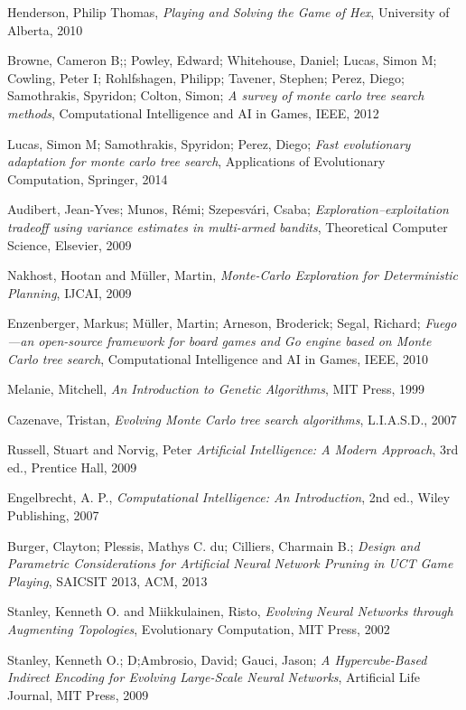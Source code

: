 \documentclass[12pt]{report}
\begin{document}
\begin{thebibliography}{99}
 Henderson, Philip Thomas, \emph{Playing and Solving the Game of Hex}, University of Alberta, 2010

 Browne, Cameron B;; Powley, Edward; Whitehouse, Daniel; Lucas, Simon M; Cowling, Peter I; Rohlfshagen, Philipp; Tavener, Stephen; Perez, Diego; Samothrakis, Spyridon; Colton, Simon; \emph{A survey of monte carlo tree search methods}, Computational Intelligence and AI in Games, IEEE, 2012

 Lucas, Simon M; Samothrakis, Spyridon; Perez, Diego; \emph{Fast evolutionary adaptation for monte carlo tree search}, Applications of Evolutionary Computation, Springer, 2014

 Audibert, Jean-Yves; Munos, R{\'e}mi; Szepesv{\'a}ri, Csaba; \emph{Exploration--exploitation tradeoff using variance estimates in multi-armed bandits}, Theoretical Computer Science, Elsevier, 2009

 Nakhost, Hootan and M{\"u}ller, Martin, \emph{Monte-Carlo Exploration for Deterministic Planning}, IJCAI, 2009

 Enzenberger, Markus; M{\"u}ller, Martin; Arneson, Broderick; Segal, Richard; \emph{Fuego—an open-source framework for board games and Go engine based on Monte Carlo tree search}, Computational Intelligence and AI in Games, IEEE, 2010

 Melanie, Mitchell, \emph{An Introduction to Genetic Algorithms},  MIT Press, 1999

 Cazenave, Tristan, \emph{Evolving Monte Carlo tree search algorithms}, L.I.A.S.D., 2007

 Russell, Stuart and Norvig, Peter \emph{Artificial Intelligence: A Modern Approach}, 3rd ed., Prentice Hall, 2009

 Engelbrecht, A. P., \emph{Computational Intelligence: An Introduction}, 2nd ed., Wiley Publishing, 2007

 Burger, Clayton; Plessis, Mathys C. du; Cilliers, Charmain B.; \emph{Design and Parametric Considerations for Artiﬁcial Neural Network Pruning in UCT Game Playing}, SAICSIT 2013, ACM, 2013

 Stanley, Kenneth O. and Miikkulainen, Risto, \emph{Evolving Neural Networks through Augmenting Topologies}, Evolutionary Computation, MIT Press, 2002

 Stanley, Kenneth O.; D;Ambrosio, David; Gauci, Jason; \emph{A Hypercube-Based Indirect Encoding for Evolving Large-Scale Neural Networks}, Artificial Life Journal, MIT Press, 2009


\end{thebibliography}
\end{document}
